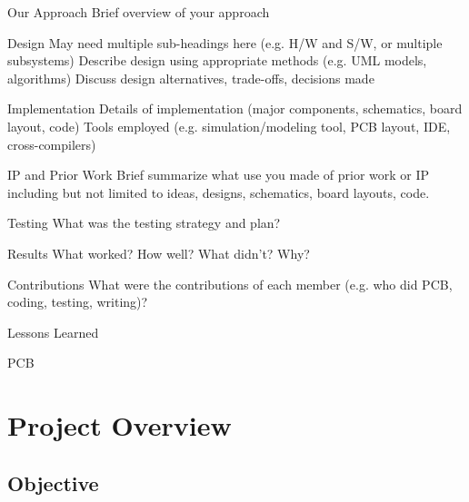 \documentclass{beamer}
\begin{document}
\begin{frame}{Our Approach}
Brief overview of your approach
\end{frame}

\begin{frame}{Design}
May need multiple sub-headings here (e.g.  H/W and S/W, or multiple
subsystems) Describe design using appropriate methods (e.g.  UML
models, algorithms) Discuss design alternatives, trade-offs, decisions
made
\end{frame}

\begin{frame}{Implementation}
Details of implementation (major components, schematics, board layout,
code)	  
Tools employed (e.g.  simulation/modeling tool, PCB layout, IDE,
cross-compilers)
\end{frame}

\begin{frame}{IP and Prior Work}
Brief summarize what use you made of prior work or IP including but
not limited to ideas, designs, schematics, board layouts, code.
\end{frame}

\begin{frame}{Testing}
What was the testing strategy and plan?  
\end{frame}

\begin{frame}{Results}
What worked? How well? What didn't? Why?
  
\end{frame}

\begin{frame}{Contributions}
What were the contributions of each member (e.g.  who did PCB, coding,
testing, writing)?
  
\end{frame}
\begin{frame}{Lessons Learned}
\end{frame}

\begin{frame}{PCB}
\end{frame}


\section{Project Overview} 
\subsection{Objective}
\end{document}
